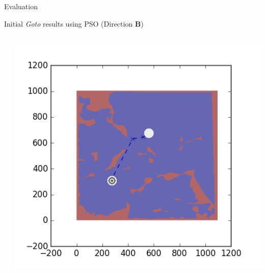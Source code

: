 \documentclass[9pt]{beamer}
\begin{document}
\begin{frame}{Evaluation}
\begin{block}{Initial \textit{Goto} results using PSO (Direction \textbf{B})}
\begin{columns}
\begin{column}{0.25\textwidth}
\begin{center}
                \end{center}
            \end{column}
            \begin{column}{0.25\textwidth}
                \begin{center}
                    \includegraphics[width=\textwidth,trim={2cm 2cm 2cm 2cm},clip]{img/EXP3RG_PathAb_-1_-1_-1_-1.png}
                \end{center}
            \end{column}
        \end{columns}
    \end{block}
\end{frame}
\end{document}
